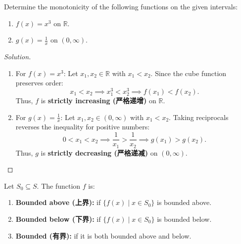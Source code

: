 \documentclass[
	UTF-8,
	11pt, %
	a4paper, %
]{LegrandOrangeBook}
\begin{document}
    \begin{example}
    Determine the monotonicity of the following functions on the given intervals:
    \begin{enumerate}
        \item $f(x) = x^3$ on $\mathbb{R}$.
        \item $g(x) = \frac{1}{x}$ on $(0, \infty)$.
    \end{enumerate}

    \begin{proof}[Solution]\quad
        \begin{enumerate}
        \item For $f(x) = x^3$:
        Let $x_1, x_2 \in \mathbb{R}$ with $x_1 < x_2$.
        Since the cube function preserves order:
        \[ x_1 < x_2 \implies x_1^3 < x_2^3 \implies f(x_1) < f(x_2). \]
        Thus, $f$ is \textbf{strictly increasing (严格递增)} on $\mathbb{R}$.

        \item For $g(x) = \frac{1}{x}$:
        Let $x_1, x_2 \in (0, \infty)$ with $x_1 < x_2$.
        Taking reciprocals reverses the inequality for positive numbers:
        \[ 0 < x_1 < x_2 \implies \frac{1}{x_1} > \frac{1}{x_2} \implies g(x_1) > g(x_2). \]
        Thus, $g$ is \textbf{strictly decreasing (严格递减)} on $(0, \infty)$.

    \end{enumerate}
    \end{proof}
    \end{example}

    \begin{definition}[Boundedness]
    Let $S_0 \subseteq S$. The function $f$ is:
    \begin{enumerate}
        \item \textbf{Bounded above (上界):} if $\{f(x) \mid x \in S_0\}$ is bounded above.
        \item \textbf{Bounded below (下界):} if $\{f(x) \mid x \in S_0\}$ is bounded below.
        \item \textbf{Bounded (有界):} if it is both bounded above and below.
    \end{enumerate}
    \end{definition}
\end{document}
